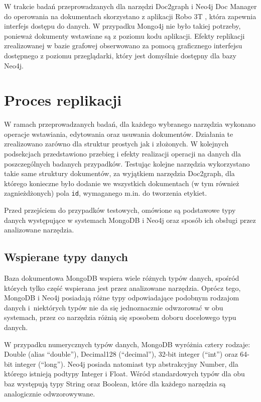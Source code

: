 \documentclass[a4paper,twoside,12pt]{book}
\begin{document}
W trakcie badań przeprowadzanych dla narzędzi Doc2graph i Neo4j Doc Manager do operowania na dokumentach skorzystano z aplikacji Robo 3T \cite{bib:robo3t}, która zapewnia interfejs dostępu do danych. W przypadku Mongo4j nie było takiej potrzeby, ponieważ dokumenty wstawiane są z poziomu kodu aplikacji. Efekty replikacji zrealizowanej w bazie grafowej obserwowano za pomocą graficznego interfejsu dostępnego z poziomu przeglądarki, który jest domyślnie dostępny dla bazy Neo4j. 

\section{Proces replikacji} 

W ramach przeprowadzanych badań, dla każdego wybranego narzędzia wykonano operacje wstawiania, edytowania oraz usuwania dokumentów. Działania te zrealizowano zarówno dla struktur prostych jak i złożonych. W kolejnych podsekcjach przedstawiono przebieg i efekty realizacji operacji na danych dla poszczególnych badanych przypadków. Testując kolejne narzędzia wykorzystano takie same struktury dokumentów, za wyjątkiem narzędzia Doc2graph, dla którego konieczne było dodanie we wszystkich dokumentach (w tym również zagnieżdżonych) pola \texttt{id}, wymaganego m.in. do tworzenia etykiet. 

Przed przejściem do przypadków testowych, omówione są podstawowe typy danych występujące w systemach MongoDB i Neo4j oraz sposób ich obsługi przez analizowane narzędzia.

\subsection{Wspierane typy danych}
\label{section:wspierane-typy-danych}

Baza dokumentowa MongoDB wspiera wiele różnych typów danych, spośród których tylko część wspierana jest przez analizowane narzędzia. Oprócz tego, MongoDB i Neo4j posiadają różne typy odpowiadające podobnym rodzajom danych i~niektórych typów nie da się jednoznacznie odwzorować w obu systemach, przez co narzędzia różnią się sposobem doboru docelowego typu danych.

W przypadku numerycznych typów danych, MongoDB wyróżnia cztery rodzaje: Double (alias ``double''), Decimal128 (``decimal''), 32-bit integer (``int'') oraz 64-bit integer (``long''). Neo4j posiada natomiast typ abstrakcyjny Number, dla którego istnieją podtypy Integer i Float. Wśród standardowych typów dla obu baz występują typy String oraz Boolean, które dla każdego narzędzia są analogicznie odwzorowywane.
\end{document}

